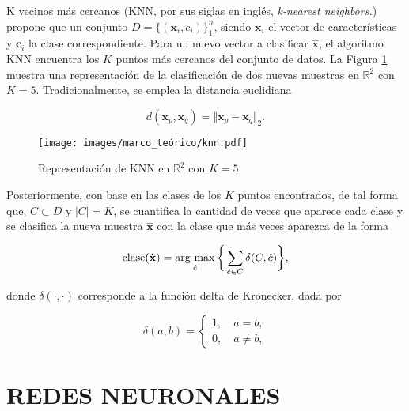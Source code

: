 K vecinos más cercanos (KNN, por sus siglas en inglés, \textit{k-nearest neighbors.}) propone que un conjunto $D = \{(\mathbf{x}_i, {c}_i)\}_1^n$, siendo $\mathbf{x}_i$ el vector de características y $\mathbf{c}_i$ la clase correspondiente. Para un nuevo vector a clasificar $\mathbf{\hat{x}}$, el algoritmo KNN encuentra los $K$ puntos más cercanos del conjunto de datos. La Figura \ref{fig:knn} muestra una representación de la clasificación de dos nuevas muestras en $\mathbb{R}^2$ con $K = 5$. Tradicionalmente, se emplea la distancia euclidiana 

\begin{equation}
    d(\mathbf{x}_p,\mathbf{x}_q) = \Vert \mathbf{x}_p-\mathbf{x}_q \Vert_2.
    \label{eq:distancia_euclidiana}
\end{equation}

\begin{figure}[H]
    \centering
    \caption{\hspace{2mm}Representación de KNN en $\mathbb{R}^2$ con $K = 5$.}
    \texttt{[image: images/marco\_teórico/knn.pdf]}
    \label{fig:knn}
\end{figure}

Posteriormente, con base en las clases de los $K$ puntos encontrados, de tal forma que, $C \subset D$ y $\vert C \vert = K$, se cuantifica la cantidad de veces que aparece cada clase y se clasifica la nueva muestra $\mathbf{\hat{x}}$ con la clase que más veces aparezca de la forma

\begin{equation}
    \mathrm{clase}(\mathbf{\hat{x}}) =  \operatorname*{arg \ max}_{\hat{c}} \bigg\{ \sum_{\hat{c} \in C} \delta(C,\hat{c})\bigg\},
\end{equation}

donde $\delta(\cdot,\cdot)$ corresponde a la función delta de Kronecker, dada por

\begin{equation}
    \delta(a,b) = \begin{cases}
        1, \quad a = b, \\
        0, \quad a \neq b,
    \end{cases}
\end{equation}
\section{REDES NEURONALES}

